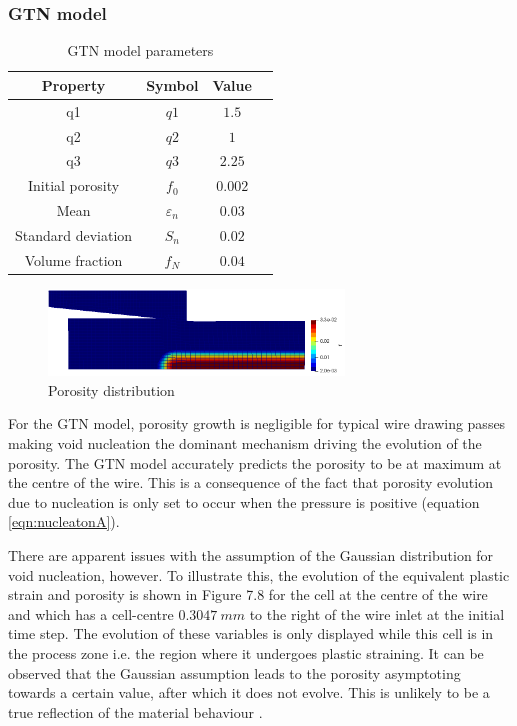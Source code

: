 \documentclass[sn-mathphys,Numbered,draft]{sn-jnl}%
\begin{document}
\subsubsection{GTN model}

\begin{table}[htb]
	\centering
		\begin{tabular}{cccc} \hline
			Property & Symbol & Value  \\ \hline 
			q1 & $q1$ & $1.5$  \\
		    q2 & $q2$ & $1$  \\
		    q3 & $q3$ & $2.25$  \\
		    Initial porosity & $f_0$ & $0.002$  \\
		    Mean & $\varepsilon_n$ & $0.03$  \\
		    Standard deviation & $S_n$ & $0.02$  \\
		    Volume fraction & $f_N$ & $0.04$  \\
			\hline
		\end{tabular}
	\caption{GTN model parameters}
	\label{tab:material_properties}
\end{table}

\begin{figure}[htb]
\begin{center}
	\includegraphics[width=0.7\textwidth]{./Figures/SimulationAndAnalysis/modelCompare/gtnModel.png}
\caption{Porosity distribution}
\label{fig:notchedRoundBAr}
\end{center}
\end{figure}

For the GTN model, porosity growth is negligible for typical wire drawing passes \cite{cao_modelling_2014} making void nucleation the dominant mechanism driving the evolution of the porosity. The GTN model accurately predicts the porosity to be at maximum at the centre of the wire. This is a consequence of the fact that porosity evolution due to nucleation is only set to occur when the pressure is positive (equation \ref{eqn:nucleatonA}). 

There are apparent issues with the assumption of the Gaussian distribution for void nucleation, however. To illustrate this, the evolution of the equivalent plastic strain and porosity is shown in Figure 7.8 for the cell at the centre of the wire and which has a cell-centre $0.3047\ mm$ to the right of the wire inlet at the initial time step. The evolution of these variables is only displayed while this cell is in the process zone i.e. the region where it undergoes plastic straining. It can be observed that the Gaussian assumption leads to the porosity asymptoting towards a certain value, after which it does not evolve. This is unlikely to be a true reflection of the material behaviour \cite{cao_modelling_2014}.
\end{document}
